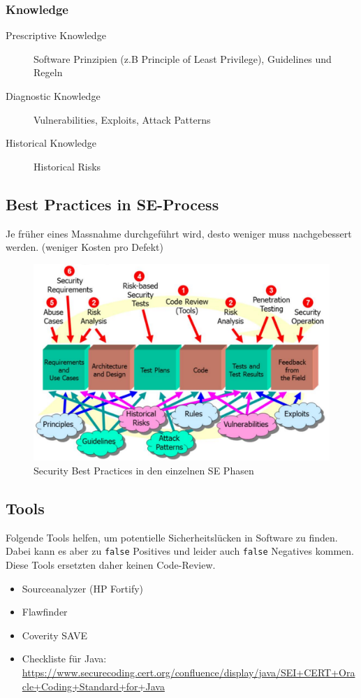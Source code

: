 \subsubsection{Knowledge}
\begin{description}
	\item[Prescriptive Knowledge] Software Prinzipien (z.B Principle of Least Privilege), Guidelines und Regeln
	\item[Diagnostic Knowledge] Vulnerabilities, Exploits, Attack Patterns
	\item[Historical Knowledge] Historical Risks
\end{description}

\clearpage

\subsection{Best Practices in SE-Process}
Je früher eines Massnahme durchgeführt wird, desto weniger muss nachgebessert werden. (weniger Kosten pro Defekt)
\begin{figure}[h!]
	\centering
	\includegraphics[width=0.7\linewidth]{images/se_bestpracitce_security}
	\caption{Security Best Practices in den einzelnen SE Phasen}
	\label{fig:sebestpracitcesecurity}
\end{figure}

\subsection{Tools}
Folgende Tools helfen, um potentielle Sicherheitslücken in Software zu finden. Dabei kann es aber zu \lstinline|false| Positives und leider auch \lstinline|false| Negatives kommen. Diese Tools ersetzten daher keinen Code-Review.

\begin{itemize}
	\item Sourceanalyzer (HP Fortify)
	\item Flawfinder
	\item Coverity SAVE
	\item Checkliste für Java: \url{https://www.securecoding.cert.org/confluence/display/java/SEI+CERT+Oracle+Coding+Standard+for+Java}
\end{itemize}

